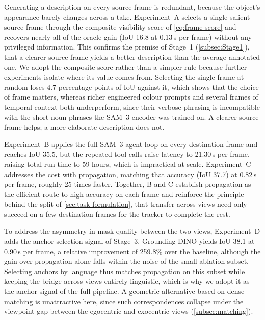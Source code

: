 Generating a description on every source frame is redundant, because the object's appearance barely changes across a take. Experiment~A selects a single salient source frame through the composite visibility score of \cref{eq:frame-score} and recovers nearly all of the oracle gain (IoU 16.8 at 0.13\,s per frame) without any privileged information. This confirms the premise of Stage~1 (\cref{subsec:Stage1}), that a clearer source frame yields a better description than the average annotated one. We adopt the composite score rather than a simpler rule because further experiments isolate where its value comes from. Selecting the single frame at random loses 4.7 percentage points of IoU against it, which shows that the choice of frame matters, whereas richer engineered colour prompts and several frames of temporal context both underperform, since their verbose phrasing is incompatible with the short noun phrases the SAM~3 encoder was trained on. A clearer source frame helps; a more elaborate description does not.

Experiment~B applies the full SAM~3 agent loop on every destination frame and reaches IoU 35.5, but the repeated tool calls raise latency to 21.30\,s per frame, raising total run time to 59 hours, which is impractical at scale. Experiment~C addresses the cost with propagation, matching that accuracy (IoU 37.7) at 0.82\,s per frame, roughly 25 times faster. Together, B and C establish propagation as the efficient route to high accuracy on each frame and reinforce the principle behind the split of \cref{sec:task-formulation}, that transfer across views need only succeed on a few destination frames for the tracker to complete the rest.

To address the asymmetry in mask quality between the two views, Experiment~D adds the anchor selection signal of Stage~3. Grounding DINO yields IoU 38.1 at 0.90\,s per frame, a relative improvement of 259.8\% over the baseline, although the gain over propagation alone falls within the noise of the small ablation subset. Selecting anchors by language thus matches propagation on this subset while keeping the bridge across views entirely linguistic, which is why we adopt it as the anchor signal of the full pipeline. A geometric alternative based on dense matching is unattractive here, since such correspondences collapse under the viewpoint gap between the egocentric and exocentric views (\cref{subsec:matching}).


